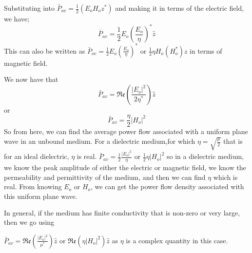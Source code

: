 Substituting into $ \bar{P}_{av}=\frac{1}{2}(E_{o}H_{o}z^{*}) $ and making it in terms of the electric field,  we have;
\begin{dmath*}
\bar{P}_{av}=\frac{1}{2}E_{o}(\frac{E_{o}}{\eta})^{*}\hat{z}  
\end{dmath*}
This can also be written as $ \bar{P}_{ov}=\frac{1}{2}E_{o}(\frac{E_{o}}{\eta})^{*} $ or  $ \frac{1}{2}\eta H_{o}(H_{o}^{*})\hat{z} $ in terms of magnetic field.

We now have that 
\begin{dmath*}
\bar{P}_{av}=\mathfrak{Re}(\frac{|E_{o}|^{2}}{2\eta^{*}})\hat{z}
\end{dmath*}
or 
\begin{dmath}
\bar{P}_{av}=\frac{\eta}{2}|H_{o}|^{2}
\end{dmath}
So from here, we can find the average power flow associated with a uniform plane wave in an unbound medium. For a dielectric medium,for which $ \eta=\sqrt{\frac{\mu}{2}} $ that is for an ideal dielectric, $ \eta $ is real.
$ \bar{P}_{av}=\frac{1}{2}\frac{|E_{o}|^{2}}{\eta} $ or $ \frac{1}{2}\eta|H_{o}|^{2} $ so in a dielectric medium, we know the peak amplitude of either the electric or magnetic field, we know the permeability and permittivity of the medium, and then we can find $ \eta $ which is real. From knowing $ E_{o} $ or $ H_{o} $, we can get the power flow density associated with this uniform plane wave.

In general, if the medium has finite conductivity that is non-zero or very large, then we go using

$ \bar{P}_{av}=\mathfrak{Re}(\frac{|E_{o}|^{2}}{\mu^{*}})\hat{z} $ or $ \mathfrak{Re}(\eta|H_{o}|^{2})\hat{z} $ 
as $ \eta $ is a complex quantity in this case.

